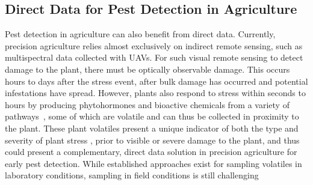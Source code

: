 \subsection{Direct Data for Pest Detection in Agriculture}
Pest detection in agriculture can also benefit from direct data. Currently, precision agriculture relies almost exclusively on indirect remote sensing, such as multispectral data collected with UAVs.
For such visual remote sensing to detect damage to the plant, there must be optically observable damage. This occurs hours to days after the stress event, after bulk damage has occurred and potential infestations have spread. However, plants also respond to stress within seconds to hours by producing phytohormones and bioactive chemicals from a variety of pathways~\cite{schuman_layers_2016}, some of which are volatile and can thus be collected in proximity to the plant. These plant volatiles present a unique indicator of both the type and severity of plant stress \cite{howe_plant_2008, dicke_evolutionary_2010}, prior to visible or severe damage to the plant, and thus could present a complementary, direct data solution in precision agriculture for early pest detection. While established approaches exist for sampling volatiles in laboratory conditions, sampling in field conditions is still challenging \cite{lang_ecological_2022,tholl_trends_2021} %
